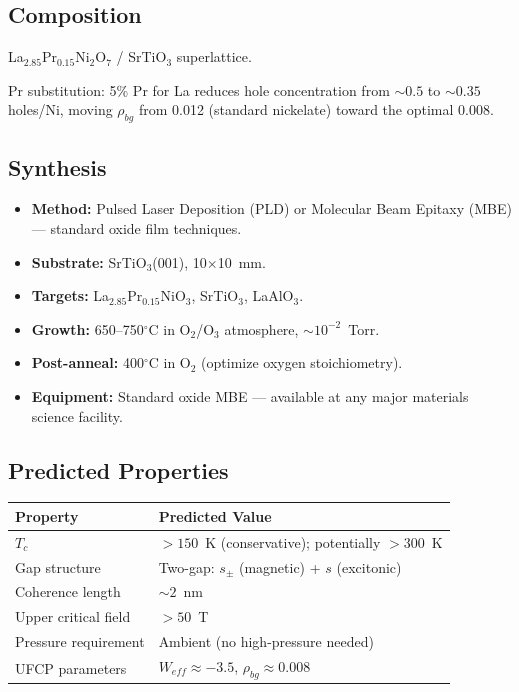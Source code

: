 \documentclass[11pt, a4paper]{article}
\begin{document}
\subsection{Composition}

La$_{2.85}$Pr$_{0.15}$Ni$_2$O$_7$ / SrTiO$_3$ superlattice.

Pr substitution: 5\% Pr for La reduces hole concentration from
$\sim 0.5$ to $\sim 0.35$ holes/Ni, moving $\rho_{bg}$ from 0.012
(standard nickelate) toward the optimal 0.008.

\subsection{Synthesis}

\begin{itemize}[nosep]
  \item \textbf{Method:} Pulsed Laser Deposition (PLD) or Molecular
        Beam Epitaxy (MBE) --- standard oxide film techniques.
  \item \textbf{Substrate:} SrTiO$_3$(001), 10$\times$10~mm.
  \item \textbf{Targets:} La$_{2.85}$Pr$_{0.15}$NiO$_3$, SrTiO$_3$,
        LaAlO$_3$.
  \item \textbf{Growth:} 650--750$^\circ$C in O$_2$/O$_3$ atmosphere,
        $\sim 10^{-2}$~Torr.
  \item \textbf{Post-anneal:} 400$^\circ$C in O$_2$ (optimize oxygen
        stoichiometry).
  \item \textbf{Equipment:} Standard oxide MBE --- available at any
        major materials science facility.
\end{itemize}

\subsection{Predicted Properties}

\begin{center}
\begin{tabular}{@{}ll@{}}
\toprule
\textbf{Property} & \textbf{Predicted Value} \\
\midrule
$T_c$ & $> 150$~K (conservative); potentially $> 300$~K \\
Gap structure & Two-gap: $s_\pm$ (magnetic) + $s$ (excitonic) \\
Coherence length & $\sim 2$~nm \\
Upper critical field & $> 50$~T \\
Pressure requirement & Ambient (no high-pressure needed) \\
UFCP parameters & $W_{eff} \approx -3.5$, $\rho_{bg} \approx 0.008$ \\
\bottomrule
\end{tabular}
\end{center}
\end{document}
